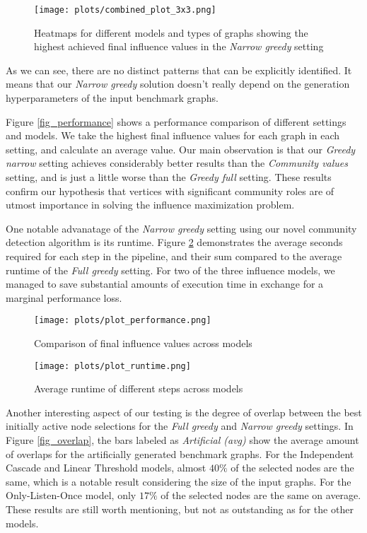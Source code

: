 \documentclass[pdflatex,sn-mathphys-num]{sn-jnl}
\begin{document}
\begin{figure}[ht]
\centering
\texttt{[image: plots/combined\_plot\_3x3.png]}
\caption{Heatmaps for different models and types of graphs showing the highest achieved final influence values in the \textit{Narrow greedy} setting}
\label{fig_performance_models_parameters}
\end{figure}

As we can see, there are no distinct patterns that can be explicitly identified. It means that our \textit{Narrow greedy} solution doesn't really depend on the generation hyperparameters of the input benchmark graphs.

Figure \ref{fig_performance} shows a performance comparison of different settings and models. We take the highest final influence values for each graph in each setting, and calculate an average value. Our main observation is that our \textit{Greedy narrow} setting achieves considerably better results than the \textit{Community values} setting, and is just a little worse than the \textit{Greedy full} setting. These results confirm our hypothesis that vertices with significant community roles are of utmost importance in solving the influence maximization problem.

One notable advanatage of the \textit{Narrow greedy} setting using our novel community detection algorithm is its runtime. Figure \ref{fig_runtimes} demonstrates the average seconds required for each step in the pipeline, and their sum compared to the average runtime of the \textit{Full greedy} setting. For two of the three influence models, we managed to save substantial amounts of execution time in exchange for a marginal performance loss.

\begin{figure}[ht]
\centering
\begin{minipage}[b]{0.45\textwidth}
\texttt{[image: plots/plot\_performance.png]}
\caption{Comparison of final influence values across models}
\label{fig_performance}
\end{minipage}
\hfill
\begin{minipage}[b]{0.45\textwidth}
\texttt{[image: plots/plot\_runtime.png]}
\caption{Average runtime of different steps across models}
\label{fig_runtimes}
\end{minipage}
\end{figure}

Another interesting aspect of our testing is the degree of overlap between the best initially active node selections for the \textit{Full greedy} and \textit{Narrow greedy} settings. In Figure \ref{fig_overlap}, the bars labeled as \textit{Artificial (avg)} show the average amount of overlaps for the artificially generated benchmark graphs. For the Independent Cascade and Linear Threshold models, almost $40\%$ of the selected nodes are the same, which is a notable result considering the size of the input graphs. For the Only-Listen-Once model, only $17\%$ of the selected nodes are the same on average. These results are still worth mentioning, but not as outstanding as for the other models.
\end{document}
